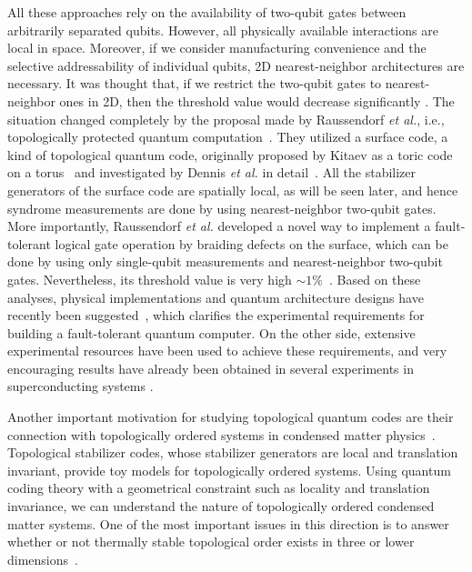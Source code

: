 All these approaches rely on the availability of two-qubit gates between arbitrarily separated qubits.
However, all physically available interactions are local in space. 
Moreover, if we consider manufacturing convenience and the selective addressability of individual qubits, 2D nearest-neighbor architectures are necessary.
It was thought that, if we restrict the two-qubit gates to nearest-neighbor ones in 2D, then the threshold value would decrease significantly \cite{Svore}.
The situation changed completely by the proposal made by Raussendorf {\it et al.}, i.e., topologically protected quantum computation~\cite{RaussendorfPRL,RaussendorfNJP,RaussendorfAnn}. 
They utilized a surface code, a kind of topological quantum code, originally proposed by Kitaev as a toric code on a torus~\cite{Kitaev} and investigated by Dennis {\it et al.} in detail~\cite{Dennis}.
All the stabilizer generators of the surface code are spatially local, as will be seen later, and hence syndrome measurements are done by using nearest-neighbor two-qubit gates.
More importantly, Raussendorf {\it et al.} developed a novel way to implement a fault-tolerant logical gate operation by braiding defects on the surface, which can be done by using only single-qubit measurements and nearest-neighbor two-qubit gates.
Nevertheless, its threshold value is very high $\sim 1\%$~\cite{RaussendorfPRL,RaussendorfNJP,RaussendorfAnn,WangFowler}.
Based on these analyses, physical implementations and quantum architecture designs have recently been suggested~\cite{VanMeter,LiBenjamin,FTProb,Jones12,FujiiDis,Benjamin1,Benjamin2,Fowler1,Fowler2}, which clarifies the experimental requirements for building a fault-tolerant quantum computer.
On the other side, extensive experimental resources have been used to achieve these requirements, and very encouraging results have already been obtained in several experiments 
in superconducting systems \cite{Chow12IBM,IBM13,UCSB14,IBM14}.

Another important motivation for studying topological quantum codes are their connection with topologically ordered systems in condensed matter physics~\cite{Kitaev}.
Topological stabilizer codes, whose stabilizer generators are local and translation invariant, provide toy models for topologically ordered systems.
Using quantum coding theory with a geometrical constraint such as locality and translation invariance, we can understand the nature of topologically ordered condensed matter systems.
One of the most important issues in this direction is to answer whether or not thermally stable topological order exists in three or lower dimensions~\cite{BravyiTerhal,BeniThermal3D}.

